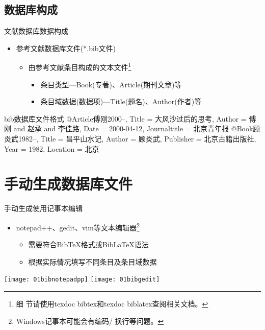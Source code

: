 \documentclass[fontset = none, t]{ctexbeamer}
\begin{document}
\subsection[数据库构成]{数据库构成}
\begin{frame}[fragile]{文献数据库}{数据构成}
  \begin{spacing}{1.0}
    \begin{itemize}
    \item 参考文献数据库文件(\alert{*.bib}文件)
      \begin{itemize}
      \item 由参考文献条目构成的\alert{文本文件}\footnote[frame,2]{细
          节请使用texdoc bibtex和texdoc biblatex查阅相关文档。}
        \begin{itemize}
        \item 条目类型---Book(专著)、Article(期刊文章)等
        \item 条目域数据(数据项)---Title(题名)、Author(作者)等
        \end{itemize}
      \end{itemize}
    \end{itemize}
  \end{spacing}
  \vspace{-2.0ex}
  \begin{center}
    \begin{minipage}[h]{0.55\linewidth}
    \begin{textcb}{bib数据库文件格式}
      @Article{傅刚2000--,
        Title = {大风沙过后的思考},
        Author = {傅刚 and 赵承 and 李佳路},
        Date = {2000-04-12},
        Journaltitle = {北京青年报}
      }
      @Book{顾炎武1982--,
        Title = {昌平山水记},
        Author = {顾炎武},
        Publisher = {北京古籍出版社},
        Year = {1982},
        Location = {北京}
      }
    \end{textcb}
    \end{minipage}
  \end{center}
\end{frame}
\section[手动生成]{手动生成数据库文件}
\begin{frame}[fragile]{手动生成}{使用记事本编辑}
  \begin{spacing}{1.8}
    \begin{itemize}
    \item notepad++、gedit、vim等文本编辑器\footnote[frame,2]{Windows记事本可能会有编码/
        换行等问题。}
      \begin{itemize}
      \item 需要符合Bib\TeX 格式或Bib\LaTeX 语法
      \item 根据实际情况填写不同条目及条目域数据
      \end{itemize}
    \end{itemize}    
    \begin{center}
      \texttt{[image: 01bibnotepadpp]}\quad
      \texttt{[image: 01bibgedit]}
    \end{center}
  \end{spacing}
\end{frame}
\end{document}
